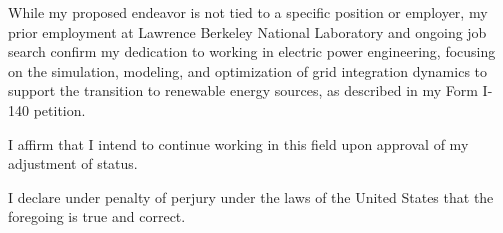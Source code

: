 While my proposed endeavor is not tied to a specific position or employer, my prior employment at Lawrence Berkeley National Laboratory and ongoing job search confirm my dedication to working in electric power engineering, focusing on the simulation, modeling, and optimization of grid integration dynamics to support the transition to renewable energy sources, as described in my Form I-140 petition.

I affirm that I intend to continue working in this field upon approval of my adjustment of status.

I declare under penalty of perjury under the laws of the United States that the foregoing is true and correct.

\label{endOfStatementofIntent}
\clearpage
\pagestyle{empty}